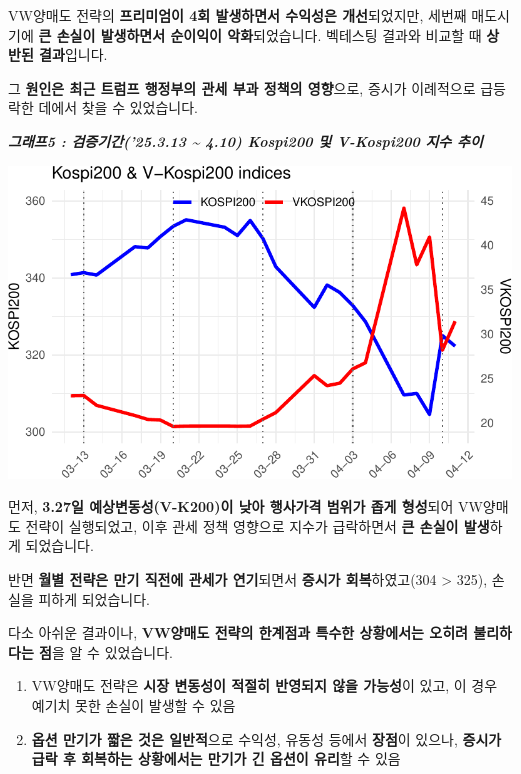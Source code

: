 \documentclass[
  a4paper,
  DIV=11,
  numbers=noendperiod]{scrreprt}
\providecommand{\tightlist}{%
  \setlength{\itemsep}{0pt}\setlength{\parskip}{0pt}}\usepackage{longtable,booktabs,array}
\begin{document}
VW양매도 전략의 \textbf{프리미엄이 4회 발생하면서 수익성은
개선}되었지만, 세번째 매도시기에 \textbf{큰 손실이 발생하면서 순이익이
악화}되었습니다. 벡테스팅 결과와 비교할 때 \textbf{상반된 결과}입니다.

그 \textbf{원인은 최근 트럼프 행정부의 관세 부과 정책의 영향}으로,
증시가 이례적으로 급등락한 데에서 찾을 수 있었습니다.

\newpage

\textbf{\emph{그래프5 : 검증기간('25.3.13 \textasciitilde{} 4.10)
Kospi200 및 V-Kospi200 지수 추이}}

\includegraphics{사례_과제_files/figure-pdf/unnamed-chunk-14-1.pdf}

먼저, \textbf{3.27일 예상변동성(V-K200)이 낮아 행사가격 범위가 좁게
형성}되어 VW양매도 전략이 실행되었고, 이후 관세 정책 영향으로 지수가
급락하면서 \textbf{큰 손실이 발생}하게 되었습니다.

반면 \textbf{월별 전략은 만기 직전에 관세가 연기}되면서 \textbf{증시가
회복}하였고(304 \textgreater{} 325), 손실을 피하게 되었습니다.

다소 아쉬운 결과이나, \textbf{VW양매도 전략의 한계점과 특수한 상황에서는
오히려 불리하다는 점}을 알 수 있었습니다.

\begin{enumerate}
\def\labelenumi{\arabic{enumi}.}
\tightlist
\item
  VW양매도 전략은 \textbf{시장 변동성이 적절히 반영되지 않을 가능성}이
  있고, 이 경우 예기치 못한 손실이 발생할 수 있음
\item
  \textbf{옵션 만기가 짧은 것은 일반적}으로 수익성, 유동성 등에서
  \textbf{장점}이 있으나, \textbf{증시가 급락 후 회복하는 상황에서는
  만기가 긴 옵션이 유리}할 수 있음
\end{enumerate}
\end{document}
